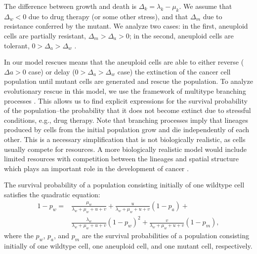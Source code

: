 \documentclass[12pt]{extarticle}
\begin{document}
The difference between growth and death is $\Delta_k = \lambda_k-\mu_k$.
We assume that $\Delta_w<0$ due to drug therapy (or some other stress), and that $\Delta_m$ due to resistance conferred by the mutant.
We analyze two cases: in the first, aneuploid cells are partially resistant, $\Delta_m>\Delta_a>0$; in the second, aneuploid cells are tolerant, %
$0>\Delta_a>\Delta_w$  \cite{brauner2016distinguishing}.

In our model rescues means that the aneuploid cells are able to either reverse ($\Delta a>0$ case) or delay ($0>\Delta_a>\Delta_w$ case) the extinction of the cancer cell population until mutant cells are generated and rescue the population.
To analyze evolutionary rescue in this model, we use the framework of multitype branching processes \cite{rybnikov2021fitness,harris1963theory}. %
This allows us to find explicit expressions for the survival probability of the population--the probability that it does not become extinct due to stressful conditions, e.g., drug therapy.
Note that branching processes imply that lineages produced by cells from the initial population grow and die independently of each other. This is a necessary simplification that is not biologically realistic, as cells usually compete for resources. A more biologically realistic model would include limited resources with competition between the lineages and spatial structure which plays an important role in the development of cancer \cite{martens2011spatial}. %

The survival probability of a population consisting initially of one wildtype cell satisfies the quadratic equation:
\begin{equation} \label{quadraticeqev1}
\begin{aligned}
1-p_w = & \frac{\mu_w}{\lambda_w+\mu_w+u+v} + 
		  \frac{u}{\lambda_w+\mu_w+u+v}\left(1-p_a\right) + \\
		  & \frac{\lambda_w}{\lambda_w+\mu_w+u+v}\left(1-p_w\right)^2 +
		  \frac{v}{\lambda_w+\mu_w+u+v}\left(1-p_m\right) ,
\end{aligned}
\end{equation}
where the $p_w$, $p_a$, and $p_m$ are the survival probabilities of a population consisting initially of one wildtype cell, one aneuploid cell, and one mutant cell, respectively.
\end{document}
